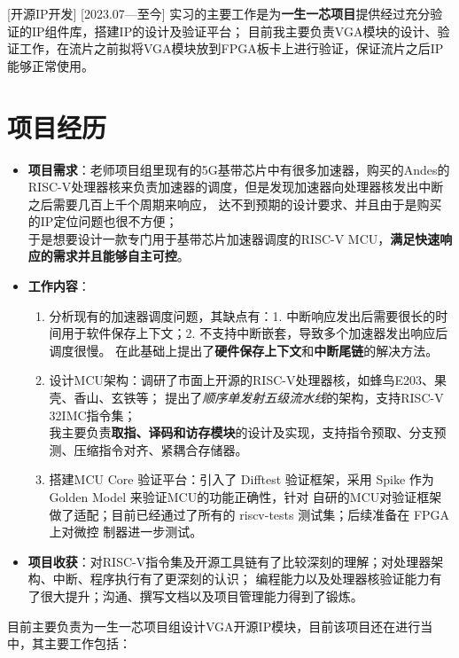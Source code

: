 \documentclass{resume}
\begin{document}
[开源IP开发]
[2023.07—至今] 
实习的主要工作是为\textbf{一生一芯项目}提供经过充分验证的IP组件库，搭建IP的设计及验证平台；
目前我主要负责VGA模块的设计、验证工作，在流片之前拟将VGA模块放到FPGA板卡上进行验证，保证流片之后IP能够正常使用。
\section{项目经历}
\begin{itemize}
    \item \textbf{项目需求}：老师项目组里现有的5G基带芯片中有很多加速器，购买的Andes的RISC-V处理器核来负责加速器的调度，但是发现加速器向处理器核发出中断之后需要几百上千个周期来响应，
    达不到预期的设计要求、并且由于是购买的IP定位问题也很不方便；\\
    于是想要设计一款专门用于基带芯片加速器调度的RISC-V MCU，\textbf{满足快速响应的需求并且能够自主可控}。
    \item \textbf{工作内容}：
    \begin{enumerate}
        \item 分析现有的加速器调度问题，其缺点有：1. 中断响应发出后需要很长的时间用于软件保存上下文；2. 不支持中断嵌套，导致多个加速器发出响应后调度很慢。
              在此基础上提出了\textbf{硬件保存上下文}和\textbf{中断尾链}的解决方法。
        \item 设计MCU架构：调研了市面上开源的RISC-V处理器核，如蜂鸟E203、果壳、香山、玄铁等；
              提出了\textit{顺序单发射五级流水线}的架构，支持RISC-V 32IMC指令集；\\ 
              我主要负责\textbf{取指、译码和访存模块}的设计及实现，支持指令预取、分支预测、压缩指令对齐、紧耦合存储器。
        \item 搭建MCU Core 验证平台：引入了 Difftest 验证框架，采用 Spike 作为 Golden Model 来验证MCU的功能正确性，针对 自研的MCU对验证框架做了适配；目前已经通过了所有的 riscv-tests 测试集；后续准备在 FPGA 上对微控 制器进一步测试。
    \end{enumerate}
    \item \textbf{项目收获}：对RISC-V指令集及开源工具链有了比较深刻的理解；对处理器架构、中断、程序执行有了更深刻的认识；
          编程能力以及处理器核验证能力有了很大提升；沟通、撰写文档以及项目管理能力得到了锻炼。
\end{itemize}

目前主要负责为一生一芯项目组设计VGA开源IP模块，目前该项目还在进行当中，其主要工作包括：
\end{document}
